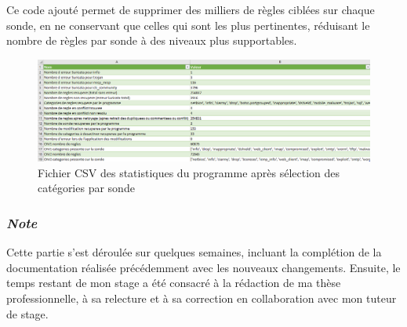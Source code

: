 \newpage

Ce code ajouté permet de supprimer des milliers de règles ciblées sur chaque sonde, en ne conservant que celles qui sont les plus pertinentes, réduisant le nombre de règles par sonde à des niveaux plus supportables.

\vspace{1em}

\begin{figure}[h]%
    \center%
    \includegraphics[width=1
    \textwidth]{assets/statOpti.png}
    \caption[Fichier CSV des statistiques du programme après sélection des catégories par sonde]{Fichier CSV des statistiques du programme après sélection des catégories par sonde}\label{fig:CategoriStat}
\end{figure}

\vspace{1em}

\subsubsection{\textit{Note}}
Cette partie s'est déroulée sur quelques semaines, incluant la complétion de la documentation réalisée précédemment avec les nouveaux changements. Ensuite, le temps restant de mon stage a été consacré à la rédaction de ma thèse professionnelle, à sa relecture et à sa correction en collaboration avec mon tuteur de stage.